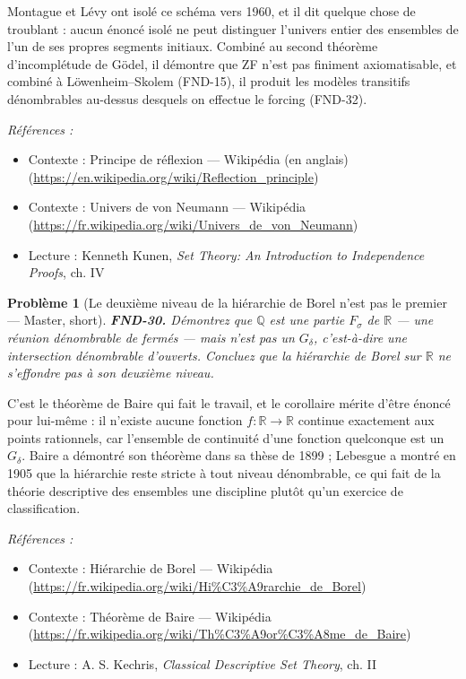 \documentclass[11pt]{article}
\newtheorem{problem}{Problème}
\newenvironment{refs}{\par\small\noindent\emph{Références :}\begin{itemize}\setlength\itemsep{0pt}}{\end{itemize}\normalsize}
\begin{document}
\noindent Montague et Lévy ont isolé ce schéma vers 1960, et il dit quelque chose de
troublant : aucun énoncé isolé ne peut distinguer l'univers entier des ensembles de l'un de ses
propres segments initiaux. Combiné au second théorème d'incomplétude de Gödel, il démontre que ZF
n'est pas finiment axiomatisable, et combiné à Löwenheim--Skolem (FND-15), il produit les modèles
transitifs dénombrables au-dessus desquels on effectue le forcing (FND-32).

\begin{refs}
\item Contexte : Principe de réflexion --- Wikipédia (en anglais) (\url{https://en.wikipedia.org/wiki/Reflection_principle})
\item Contexte : Univers de von Neumann --- Wikipédia (\url{https://fr.wikipedia.org/wiki/Univers_de_von_Neumann})
\item Lecture : Kenneth Kunen, \textit{Set Theory: An Introduction to Independence Proofs}, ch. IV
\end{refs}

\bigskip

\begin{problem}[{Le deuxième niveau de la hiérarchie de Borel n'est pas le premier --- Master, short}]
\textbf{FND-30.} Démontrez que $\mathbb{Q}$ est une partie $ F_\sigma $ de $\mathbb{R}$ --- une
réunion dénombrable de fermés --- mais n'est pas un $ G_\delta $, c'est-à-dire une intersection
dénombrable d'ouverts. Concluez que la hiérarchie de Borel sur $\mathbb{R}$ ne s'effondre pas à son deuxième
niveau.
\end{problem}

\noindent C'est le théorème de Baire qui fait le travail, et le corollaire mérite d'être
énoncé pour lui-même : il n'existe aucune fonction $ f : \mathbb{R} \to \mathbb{R} $ continue
exactement aux points rationnels, car l'ensemble de continuité d'une fonction quelconque est un
$ G_\delta $. Baire a démontré son théorème dans sa thèse de 1899 ; Lebesgue a montré en 1905
que la hiérarchie reste stricte à tout niveau dénombrable, ce qui fait de la théorie descriptive
des ensembles une discipline plutôt qu'un exercice de classification.

\begin{refs}
\item Contexte : Hiérarchie de Borel --- Wikipédia (\url{https://fr.wikipedia.org/wiki/Hi%C3%A9rarchie_de_Borel})
\item Contexte : Théorème de Baire --- Wikipédia (\url{https://fr.wikipedia.org/wiki/Th%C3%A9or%C3%A8me_de_Baire})
\item Lecture : A. S. Kechris, \textit{Classical Descriptive Set Theory}, ch. II
\end{refs}
\end{document}
